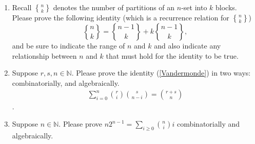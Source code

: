 \documentclass[10pt, AMS Euler]{article}
\newcommand{\ds}{\displaystyle}
\newcommand{\N}{\mathbb{N}}
\newcommand{\stirling}[2]{\genfrac{\{}{\}}{0pt}{}{#1}{#2}}
\begin{document}
\begin{enumerate}
\item Recall $\stirling{n}{k}$ denotes the number of partitions of an $n$-set into $k$ blocks.  
Please prove the following  identity (which is a recurrence relation for $\stirling{n}{k}$)
$$\stirling{n}{k} = \stirling{n-1}{k} + k\stirling{n-1}{k},$$
and be sure to indicate the range of $n$ and $k$ and also indicate any relationship between $n$ and $k$ that must hold for the identity to be true.

\item  Suppose $r,s,n \in \N$.  Please prove the identity (\ref{Vandermonde}) in two ways: combinatorially, and algebraically.
\begin{eqnarray} \ds \sum_{i = 0}^n \binom{r}{i}\binom{s}{n-i} = \binom{r+s}{n} \label{Vandermonde} \end{eqnarray}.

\item Suppose $n \in \N$. Please prove $\ds n2^{n-1} = \sum_{i \geq 0}\binom{n}{i}i$ combinatorially and algebraically. 
\end{enumerate}


\noindent \underline{\hspace{3in}}\\
\end{document}
